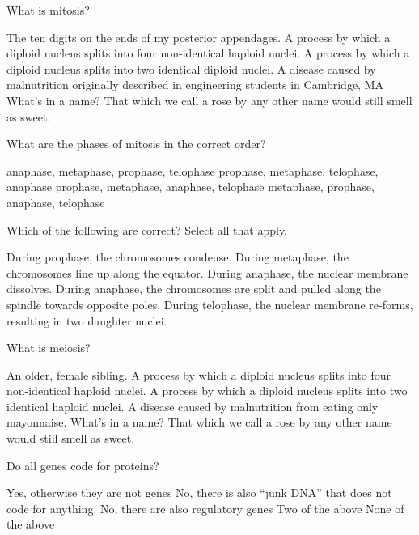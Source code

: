 \documentclass[exam,addpoints,noanswers]{exam}
\begin{document}
\begin{questions}
\question[1] What is mitosis? 
\begin{choices}
\choice The ten digits on the ends of my posterior appendages. 
\choice A process by which a diploid nucleus splits into four non-identical haploid nuclei.
\CorrectChoice A process by which a diploid nucleus splits into two identical diploid nuclei. 
\choice A disease caused by malnutrition originally described in engineering students in Cambridge, MA
\choice What's in a name? That which we call a rose by any other name would still smell as sweet. 
\end{choices}

\question[1] What are the phases of mitosis in the correct order?
\begin{choices}
\choice anaphase, metaphase, prophase, telophase
\choice prophase, metaphase, telophase, anaphase
\CorrectChoice prophase, metaphase, anaphase, telophase
\choice metaphase, prophase, anaphase, telophase
\end{choices}

\question[1] Which of the following are correct? Select all that apply.
\begin{choices}
\CorrectChoice During prophase, the chromosomes condense. 
\CorrectChoice During metaphase, the chromosomes line up along the equator.
\CorrectChoice During anaphase, the nuclear membrane dissolves.
\CorrectChoice During anaphase, the chromosomes are split and pulled along the spindle towards opposite poles.
\CorrectChoice During telophase, the nuclear membrane re-forms, resulting in two daughter nuclei.
\end{choices}

\question[1] What is meiosis? 
\begin{choices}
\choice An older, female sibling. 
\CorrectChoice A process by which a diploid nucleus splits into four non-identical haploid nuclei.
\choice A process by which a diploid nucleus splits into two identical haploid nuclei. 
\choice A disease caused by malnutrition from eating only mayonnaise. 
\choice What's in a name? That which we call a rose by any other name would still smell as sweet. 
\end{choices}

\question[1] Do all genes code for proteins? 
\begin{choices}
\choice Yes, otherwise they are not genes
\choice No, there is also ``junk DNA'' that does not code for anything.
\choice No, there are also regulatory genes
\choice Two of the above
\choice None of the above
\end{choices}


\end{questions}
\end{document}
